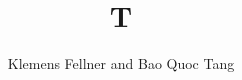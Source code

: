 \documentclass{amsart}
\begin{document}
\title{T}
\author{Klemens Fellner and Bao Quoc Tang}
\address{Graz}
\maketitle
\end{document}
